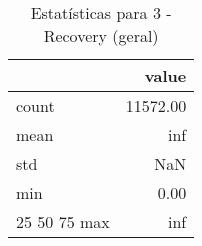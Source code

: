 \begin{table}[htbp]
\caption{Estatísticas para 3 - Recovery (geral)}
\label{tab:3_-_recovery_(geral)_summary}
\begin{tabular}{lr}
\toprule
 & value \\
\midrule
count & 11572.00 \\
mean & inf \\
std & NaN \\
min & 0.00 \\
25%
50%
75%
max & inf \\
\bottomrule
\end{tabular}
\end{table}
